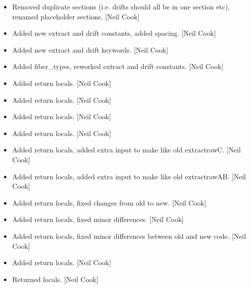 \documentclass[a4paper,10pt,english]{report}
\begin{document}
\begin{itemize}
\item {} 
Removed duplicate sections (i.e. drifts should all be in one section
etc), renamed placeholder sections. {[}Neil Cook{]}

\item {} 
Added new extract and drift constants, added spacing. {[}Neil Cook{]}

\item {} 
Added new extract and drift keywords. {[}Neil Cook{]}

\item {} 
Added fiber\_types, reworked extract and drift constants. {[}Neil Cook{]}

\item {} 
Added return locals. {[}Neil Cook{]}

\item {} 
Added return locals. {[}Neil Cook{]}

\item {} 
Added return locals. {[}Neil Cook{]}

\item {} 
Added return locals. {[}Neil Cook{]}

\item {} 
Added return locals, added extra input to make like old extractrawC.
{[}Neil Cook{]}

\item {} 
Added return locals, added extra input to make like old extractrawAB.
{[}Neil Cook{]}

\item {} 
Added return locals, fixed changes from old to new. {[}Neil Cook{]}

\item {} 
Added return locals, fixed minor differences. {[}Neil Cook{]}

\item {} 
Added return locals, fixed minor differences between old and new code.
{[}Neil Cook{]}

\item {} 
Added return locals. {[}Neil Cook{]}

\item {} 
Returned locals. {[}Neil Cook{]}

\end{itemize}
\end{document}
